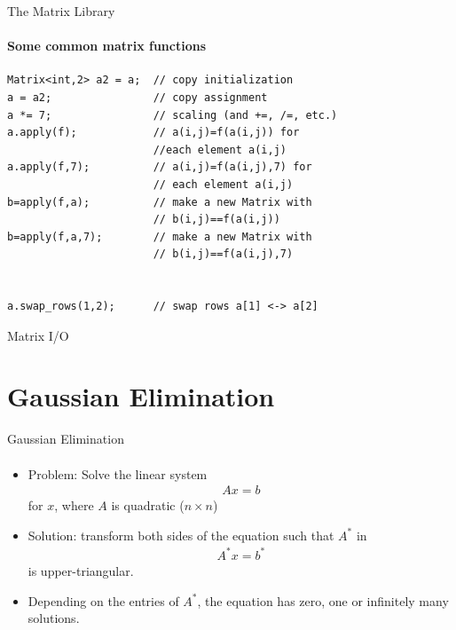 \documentclass[presentation]{beamer}
\begin{document}
\begin{frame}[fragile]{The Matrix Library}
\framesubtitle{Some common matrix functions}


\begin{lstlisting}
Matrix<int,2> a2 = a;  // copy initialization
a = a2;                // copy assignment
a *= 7;                // scaling (and +=, /=, etc.)
a.apply(f);            // a(i,j)=f(a(i,j)) for
                       //each element a(i,j)
a.apply(f,7);          // a(i,j)=f(a(i,j),7) for
                       // each element a(i,j)
b=apply(f,a);          // make a new Matrix with
                       // b(i,j)==f(a(i,j))
b=apply(f,a,7);        // make a new Matrix with
                       // b(i,j)==f(a(i,j),7)


a.swap_rows(1,2);      // swap rows a[1] <-> a[2]
\end{lstlisting}


\end{frame}

\begin{frame}{Matrix I/O}
\framesubtitle{}



\end{frame}

\section{Gaussian Elimination}

\begin{frame}{Gaussian Elimination}
\framesubtitle{}

\begin{itemize}
\item Problem: Solve the linear system
  \begin{align*}
    A x = b 
  \end{align*}
  for $x$, where $A$ is quadratic ($n \times n$)
\item Solution: transform both sides of the equation such that $A^{*}$
  in 
  \begin{align*}
    A^{*} x = b^{*}
  \end{align*}
  is upper-triangular. 
\item Depending on the entries of $A^{*}$, the equation has zero, one
  or infinitely many solutions.
\end{itemize}

\end{frame}
\end{document}
